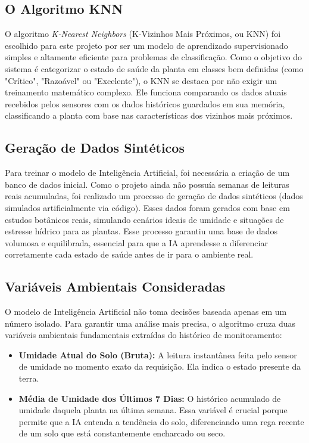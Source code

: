 \documentclass[
	12pt,
	article,
	oneside,
	a4paper,
	english,
	brazil
	]{abntex2}
\begin{document}
\subsection{O Algoritmo KNN}
O algoritmo \textit{K-Nearest Neighbors} (K-Vizinhos Mais Próximos, ou KNN) foi escolhido para este projeto por ser um modelo de aprendizado supervisionado simples e altamente eficiente para problemas de classificação. Como o objetivo do sistema é categorizar o estado de saúde da planta em classes bem definidas (como "Crítico", "Razoável" ou "Excelente"), o KNN se destaca por não exigir um treinamento matemático complexo. Ele funciona comparando os dados atuais recebidos pelos sensores com os dados históricos guardados em sua memória, classificando a planta com base nas características dos vizinhos mais próximos.

\subsection{Geração de Dados Sintéticos}
Para treinar o modelo de Inteligência Artificial, foi necessária a criação de um banco de dados inicial. Como o projeto ainda não possuía semanas de leituras reais acumuladas, foi realizado um processo de geração de dados sintéticos (dados simulados artificialmente via código). Esses dados foram gerados com base em estudos botânicos reais, simulando cenários ideais de umidade e situações de estresse hídrico para as plantas. Esse processo garantiu uma base de dados volumosa e equilibrada, essencial para que a IA aprendesse a diferenciar corretamente cada estado de saúde antes de ir para o ambiente real.

\subsection{Variáveis Ambientais Consideradas}
O modelo de Inteligência Artificial não toma decisões baseada apenas em um número isolado. Para garantir uma análise mais precisa, o algoritmo cruza duas variáveis ambientais fundamentais extraídas do histórico de monitoramento:
%
\begin{itemize}
    \item \textbf{Umidade Atual do Solo (Bruta):} A leitura instantânea feita pelo sensor de umidade no momento exato da requisição. Ela indica o estado presente da terra.
    \item \textbf{Média de Umidade dos Últimos 7 Dias:} O histórico acumulado de umidade daquela planta na última semana. Essa variável é crucial porque permite que a IA entenda a tendência do solo, diferenciando uma rega recente de um solo que está constantemente encharcado ou seco.
\end{itemize}
\end{document}
